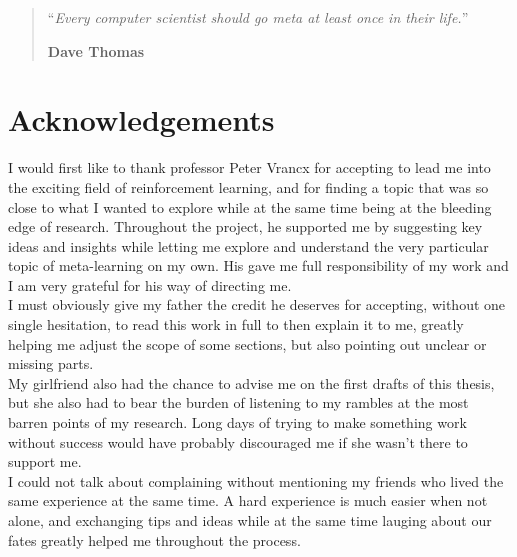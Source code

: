 \documentclass[11pt,a4paper,oneside]{book}
\begin{document}

\begin{quotation}
\noindent ``\emph{Every computer scientist should go meta at least once in
	their life.}''
\begin{flushright}\textbf{Dave Thomas}\end{flushright}
\end{quotation}

\medskip


\chapter*{Acknowledgements}
\thispagestyle{empty} 

\noindent I would first like to thank professor Peter Vrancx for accepting
to lead me into the exciting field of reinforcement learning, and for finding
a topic that was so close to what I wanted to explore while at the same
time being at the bleeding edge of research. Throughout the project, he
supported me by suggesting key ideas and insights while letting me explore
and understand the very particular topic of meta-learning on my own. His
gave me full responsibility of my work and I am very grateful for his way 
of directing me.\\

I must obviously give my father the credit he deserves for accepting, without
one single hesitation, to read this work in full to then explain it to me,
greatly helping me adjust the scope of some sections, but also pointing out
unclear or missing parts.\\

My girlfriend also had the chance to advise me on the first drafts of this 
thesis, but she also had to bear the burden of listening to my rambles at
the most barren points of my research. Long days of trying to make something
work without success would have probably discouraged me if she wasn't there
to support me.\\

I could not talk about complaining without mentioning my friends who lived the
same experience at the same time. A hard experience is much easier when not
alone, and exchanging tips and ideas while at the same time lauging about
our fates greatly helped me throughout the process.
\end{document}
